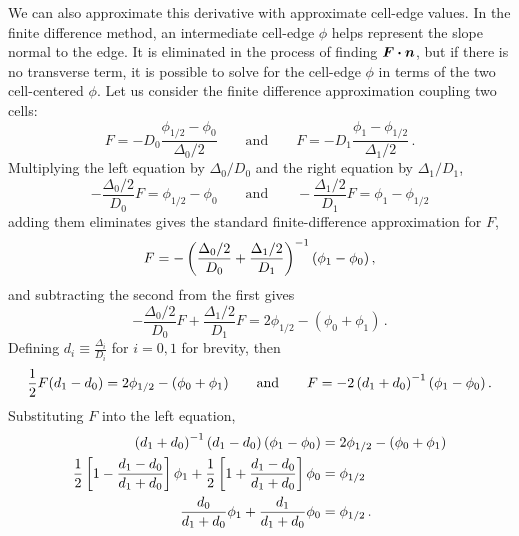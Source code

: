 We can also approximate this derivative with approximate cell-edge values. In
the finite difference method, an intermediate cell-edge $\phi$ helps represent
the slope normal to the edge. It is eliminated in the process of finding
$\bm{F}\bm{\cdot}\bm{n}$, but if there is no transverse term, it is possible to
solve for the cell-edge $\phi$ in terms of the two cell-centered $\phi$. Let us
consider the finite difference approximation coupling two cells:
\begin{equation*}
  F = - D_0 \frac{\phi_{1/2} - \phi_0}{\Delta_0/2}
  \qquad\text{and}\qquad
  F = - D_1 \frac{\phi_{1} - \phi_{1/2}}{\Delta_1/2}\,.
\end{equation*}
Multiplying the left equation by $\Delta_0 / D_0$ and the right equation by
$\Delta_1 / D_1$,
\begin{equation*}
  -\frac{\Delta_0/2}{D_0 } F = \phi_{1/2} - \phi_0
  \qquad\text{and}\qquad
  -\frac{\Delta_1/2}{D_1 } F = \phi_{1} - \phi_{1/2}
\end{equation*}
adding them eliminates gives the standard finite-difference approximation for
$F$,
\begin{equation*}
  F = - \left( \frac{\Delta_0/2}{D_0 } + \frac{\Delta_1/2}{D_1 } \right)^{-1}
  \left( \phi_1 - \phi_0 \right),
\end{equation*}
and subtracting the second from the first gives
\begin{equation*}
 -\frac{\Delta_0/2}{D_0 }F + \frac{\Delta_1/2}{D_1 } F
 = 2 \phi_{1/2}-(\phi_0+\phi_1)\,.
\end{equation*}
Defining $ d_i \equiv \frac{\Delta_i}{D_i}$ for $i=0,1$ for brevity, then
\begin{equation*}
  \frac12 F (d_1 - d_0)
 = 2 \phi_{1/2}-(\phi_0+\phi_1)
  \qquad\text{and}\qquad
 F = -2\left( d_1 + d_0 \right)^{-1} (\phi_1 - \phi_0)\,.
\end{equation*}
Substituting $F$ into the left equation,
\begin{align*}
  \left( d_1 + d_0 \right)^{-1}\left(d_1 - d_0\right) (\phi_1 - \phi_0)
  &= 2 \phi_{1/2}-(\phi_0+\phi_1)
  \\
 \frac12 \left[ 1 - \frac{d_1 - d_0}{d_1 + d_0} \right] \phi_1
+ \frac12 \left[ 1 + \frac{d_1 - d_0}{d_1 + d_0} \right] \phi_0
 &= \phi_{1/2}
  \\
 \frac{d_0}{d_1 + d_0} \phi_1
+ \frac{d_1}{d_1 + d_0} \phi_0
 &= \phi_{1/2}\,.
\end{align*}

